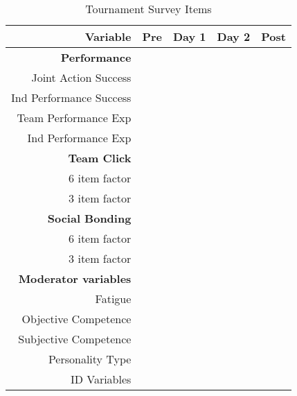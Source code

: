 \documentclass[english]{article}
\newcommand{\cmark}{\ding{51}}%
\newcommand{\xmark}{\ding{53}}%
\begin{document}
  \begin{table}[htpb]\caption{Tournament Survey Items}
    \begin{center}
      \begin{small}
          \begin{tabular}{| r | c | c | c | c |}
            \hline
            \bf Variable & \bf Pre &  \bf Day 1 & \bf Day 2 & \bf  Post \\
            \hline
            \bf Performance & & & & \\
            Joint Action Success & \cmark & \xmark & \xmark & \cmark\\
            Ind Performance Success & \cmark & \xmark & \xmark & \cmark \\
            Team Performance Exp & \cmark & \cmark & \cmark & \cmark \\
            Ind Performance Exp & \cmark & \cmark & \cmark & \cmark \\
             \bf Team Click & & & & \\
            6 item factor & \cmark & \xmark & \xmark & \cmark \\
            3 item factor & \cmark & \cmark & \cmark & \cmark \\
             \bf Social Bonding & & & & \\ 
            6 item factor & \cmark & \xmark & \xmark & \cmark \\
            3 item factor & \cmark & \cmark & \cmark & \cmark \\
             \bf Moderator variables & & & & \\ 
           Fatigue & \xmark & \cmark & \cmark & \cmark \\
            Objective Competence & \cmark & \xmark & \xmark & \xmark \\
            Subjective Competence & \cmark & \xmark & \xmark & \xmark \\
            Personality Type & \cmark & \xmark & \xmark & \xmark \\
            ID Variables & \cmark & \xmark & \xmark & \xmark \\
               \hline
        \end{tabular}
      \end{small}
    \end{center}
  \end{table}
\end{document}
